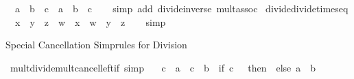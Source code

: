 \begin{isabellebody}
\ \ {\isachardoublequoteopen}{\isacharparenleft}{\kern0pt}a\ {\isacharslash}{\kern0pt}\ b{\isacharparenright}{\kern0pt}\ {\isacharslash}{\kern0pt}\ c\ {\isacharequal}{\kern0pt}\ a\ {\isacharslash}{\kern0pt}\ {\isacharparenleft}{\kern0pt}b\ {\isacharasterisk}{\kern0pt}\ c{\isacharparenright}{\kern0pt}{\isachardoublequoteclose}\isanewline
%
\isadelimproof
\ \ %
\endisadelimproof
%
\isatagproof
{}\isamarkupfalse%
\ {\isacharparenleft}{\kern0pt}simp\ add{\isacharcolon}{\kern0pt}\ divide{\isacharunderscore}{\kern0pt}inverse\ mult{\isachardot}{\kern0pt}assoc{\isacharparenright}{\kern0pt}%
\endisatagproof
{\isafoldproof}%
%
\isadelimproof
\isanewline
%
\endisadelimproof
\isanewline
{}\isamarkupfalse%
\ divide{\isacharunderscore}{\kern0pt}divide{\isacharunderscore}{\kern0pt}times{\isacharunderscore}{\kern0pt}eq{\isacharcolon}{\kern0pt}\isanewline
\ \ {\isachardoublequoteopen}{\isacharparenleft}{\kern0pt}x\ {\isacharslash}{\kern0pt}\ y{\isacharparenright}{\kern0pt}\ {\isacharslash}{\kern0pt}\ {\isacharparenleft}{\kern0pt}z\ {\isacharslash}{\kern0pt}\ w{\isacharparenright}{\kern0pt}\ {\isacharequal}{\kern0pt}\ {\isacharparenleft}{\kern0pt}x\ {\isacharasterisk}{\kern0pt}\ w{\isacharparenright}{\kern0pt}\ {\isacharslash}{\kern0pt}\ {\isacharparenleft}{\kern0pt}y\ {\isacharasterisk}{\kern0pt}\ z{\isacharparenright}{\kern0pt}{\isachardoublequoteclose}\isanewline
%
\isadelimproof
\ \ %
\endisadelimproof
%
\isatagproof
{}\isamarkupfalse%
\ simp%
\endisatagproof
{\isafoldproof}%
%
\isadelimproof
%
\endisadelimproof
%
\begin{isamarkuptext}%
Special Cancellation Simprules for Division%
\end{isamarkuptext}\isamarkuptrue%
\isamarkupfalse%
\ mult{\isacharunderscore}{\kern0pt}divide{\isacharunderscore}{\kern0pt}mult{\isacharunderscore}{\kern0pt}cancel{\isacharunderscore}{\kern0pt}left{\isacharunderscore}{\kern0pt}if\ {\isacharbrackleft}{\kern0pt}simp{\isacharbrackright}{\kern0pt}{\isacharcolon}{\kern0pt}\isanewline
\ \ \ {\isachardoublequoteopen}{\isacharparenleft}{\kern0pt}c\ {\isacharasterisk}{\kern0pt}\ a{\isacharparenright}{\kern0pt}\ {\isacharslash}{\kern0pt}\ {\isacharparenleft}{\kern0pt}c\ {\isacharasterisk}{\kern0pt}\ b{\isacharparenright}{\kern0pt}\ {\isacharequal}{\kern0pt}\ {\isacharparenleft}{\kern0pt}if\ c\ {\isacharequal}{\kern0pt}\ {}\ then\ {}\ else\ a\ {\isacharslash}{\kern0pt}\ b{\isacharparenright}{\kern0pt}{\isachardoublequoteclose}\isanewline
%
\isadelimproof
\ \ %
\endisadelimproof

\end{isabellebody}
